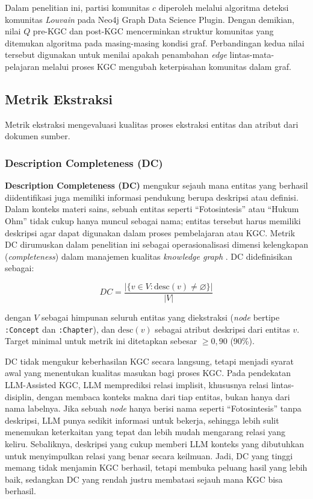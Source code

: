\documentclass[../../thesis]{subfiles}
\begin{document}
Dalam penelitian ini, partisi komunitas $c$ diperoleh melalui algoritma
deteksi komunitas \textit{Louvain} pada Neo4j Graph Data Science Plugin. Dengan demikian, nilai
$Q$ pre-KGC dan post-KGC mencerminkan struktur komunitas yang ditemukan
algoritma pada masing-masing kondisi graf. Perbandingan kedua nilai tersebut
digunakan untuk menilai apakah penambahan \textit{edge} lintas-mata-pelajaran
melalui proses KGC mengubah keterpisahan komunitas dalam graf.

\subsection{Metrik Ekstraksi}
\label{subsec:metrik-ekstraksi}

Metrik ekstraksi mengevaluasi kualitas proses ekstraksi entitas dan
atribut dari dokumen sumber.

\subsubsection{Description Completeness (DC)}

\textbf{Description Completeness (DC)} mengukur sejauh mana entitas yang
berhasil diidentifikasi juga memiliki informasi pendukung berupa
deskripsi atau definisi. Dalam konteks materi sains, sebuah entitas
seperti ``Fotosintesis'' atau ``Hukum Ohm'' tidak cukup hanya muncul
sebagai nama; entitas tersebut harus memiliki deskripsi agar dapat digunakan dalam
proses pembelajaran atau KGC. Metrik DC dirumuskan dalam penelitian ini
sebagai operasionalisasi dimensi kelengkapan (\textit{completeness}) dalam
manajemen kualitas \textit{knowledge graph} \parencite{xue_knowledge_2022}.
DC didefinisikan sebagai:

\[
  DC = \frac{\bigl|\{ v \in V : \text{desc}(v) \neq \varnothing \}\bigr|}{|V|}
\]

\noindent dengan $V$ sebagai himpunan seluruh entitas yang diekstraksi
(\textit{node} bertipe \texttt{:Concept} dan \texttt{:Chapter}), dan $\text{desc}(v)$
sebagai atribut deskripsi dari entitas $v$. Target minimal untuk metrik
ini ditetapkan sebesar $\geq 0{,}90$ (90\%).

DC tidak mengukur keberhasilan KGC secara langsung, tetapi menjadi syarat awal
yang menentukan kualitas masukan bagi proses KGC. Pada pendekatan LLM-Assisted
KGC, LLM memprediksi relasi implisit, khususnya relasi lintas-disiplin, dengan
membaca konteks makna dari tiap entitas, bukan hanya dari nama labelnya. Jika
sebuah \textit{node} hanya berisi nama seperti ``Fotosintesis'' tanpa deskripsi,
LLM punya sedikit informasi untuk bekerja, sehingga lebih sulit menemukan
keterkaitan yang tepat dan lebih mudah mengarang relasi yang keliru. Sebaliknya,
deskripsi yang cukup memberi LLM konteks yang dibutuhkan untuk menyimpulkan
relasi yang benar secara keilmuan. Jadi, DC yang tinggi memang tidak menjamin
KGC berhasil, tetapi membuka peluang hasil yang lebih baik, sedangkan DC yang
rendah justru membatasi sejauh mana KGC bisa berhasil.
\end{document}
